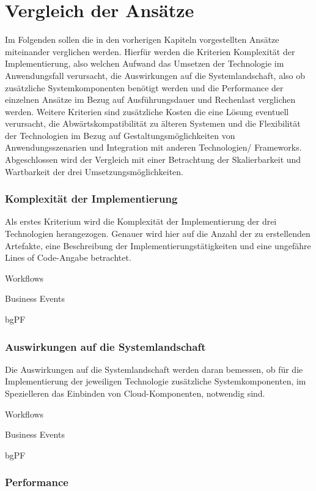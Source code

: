 \section{Vergleich der Ansätze}

Im Folgenden sollen die in den vorherigen Kapiteln vorgestellten Ansätze miteinander verglichen werden. Hierfür werden die Kriterien Komplexität der Implementierung, also welchen Aufwand das Umsetzen der Technologie im Anwendungsfall verursacht, die Auswirkungen auf die Systemlandschaft, also ob zusätzliche Systemkomponenten benötigt werden und die Performance der einzelnen Ansätze im Bezug auf Ausführungsdauer und Rechenlast verglichen werden. Weitere Kriterien sind zusätzliche Kosten die eine Lösung eventuell verursacht, die Abwärtskompatibilität zu älteren Systemen und die Flexibilität der Technologien im Bezug auf Gestaltungsmöglichkeiten von Anwendungsszenarien und Integration mit anderen Technologien/ Frameworks. Abgeschlossen wird der Vergleich mit einer Betrachtung der Skalierbarkeit und Wartbarkeit der drei Umsetzungsmöglichkeiten.

\subsubsection{Komplexität der Implementierung}

Als erstes Kriterium wird die Komplexität der Implementierung der drei Technologien herangezogen. Genauer wird hier auf die Anzahl der zu erstellenden Artefakte, eine  Beschreibung der Implementierungstätigkeiten und eine ungefähre Lines of Code-Angabe betrachtet.

Workflows

Business Events

bgPF

\subsubsection{Auswirkungen auf die Systemlandschaft}

Die Auswirkungen auf die Systemlandschaft werden daran bemessen, ob für die Implementierung der jeweiligen Technologie zusätzliche Systemkomponenten, im Spezielleren das Einbinden von Cloud-Komponenten, notwendig sind.

Workflows

Business Events

bgPF

\subsubsection{Performance}

